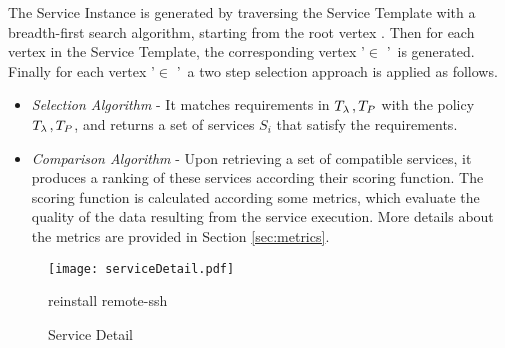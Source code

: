     The Service  Instance  is generated by traversing the Service Template with a breadth-first search algorithm,
    starting from the root vertex . Then for each vertex  in the Service Template, the corresponding vertex '$\in$ \V'\ is generated.
    Finally for each vertex  '$\in$ \V'\ a two step selection approach is applied as follows.
\begin{itemize}
  \item \textit{Selection Algorithm} - It matches requirements in $T_{\lambda\,{}},T_P$ with the policy $T_{\lambda\,{}},T_P$, and returns a set of services $S_i$ that satisfy the requirements.
  \item \textit{Comparison Algorithm} - Upon retrieving a set of compatible services, it produces a ranking of these services according their scoring function.
        The scoring function is calculated according some metrics, which evaluate the quality of the data resulting from the service execution.
        More details about the metrics are provided in Section \ref{sec:metrics}.
\end{itemize}











\begin{figure}
  \centering
  \texttt{[image: serviceDetail.pdf]}
  \caption{Service Detail}
  \label{fig:service_detail}reinstall remote-ssh
\end{figure}